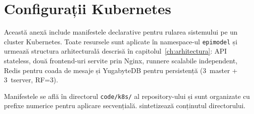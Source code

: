 \chapter{Configurații Kubernetes}
\label{app:kubernetes}

Această anexă include manifestele declarative pentru rularea sistemului
pe un cluster Kubernetes. Toate resursele sunt aplicate în namespace-ul
\texttt{epimodel} și urmează structura arhitecturală descrisă în
capitolul~\ref{ch:arhitectura}: API stateless, două frontend-uri servite prin
Nginx, runnere scalabile independent, Redis pentru coada de mesaje și
YugabyteDB pentru persistență (3~master + 3~tserver, RF=3).

Manifestele se află în directorul \texttt{code/k8s/} al repository-ului și
sunt organizate cu prefixe numerice pentru aplicare secvențială.
 sintetizează conținutul directorului.

